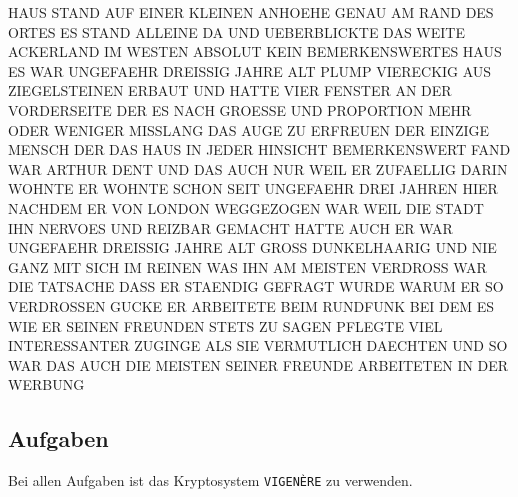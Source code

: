 \begin{spacing}{2.75}
\resetlinenumber[1]
\begin{linenumbers}
\ttfamily
HAUS STAND AUF EINER KLEINEN ANHOEHE GENAU AM RAND DES ORTES ES STAND 
ALLEINE DA UND UEBERBLICKTE DAS WEITE ACKERLAND IM WESTEN ABSOLUT KEIN 
BEMERKENSWERTES HAUS ES WAR UNGEFAEHR DREISSIG JAHRE ALT PLUMP VIERECKIG 
AUS ZIEGELSTEINEN ERBAUT UND HATTE VIER FENSTER AN DER VORDERSEITE DER ES 
NACH GROESSE UND PROPORTION MEHR ODER WENIGER MISSLANG DAS AUGE ZU ERFREUEN 
DER EINZIGE MENSCH DER DAS HAUS IN JEDER HINSICHT BEMERKENSWERT FAND WAR 
ARTHUR DENT UND DAS AUCH NUR WEIL ER ZUFAELLIG DARIN WOHNTE ER WOHNTE SCHON 
SEIT UNGEFAEHR DREI JAHREN HIER NACHDEM ER VON LONDON WEGGEZOGEN WAR WEIL DIE 
STADT IHN NERVOES UND REIZBAR GEMACHT HATTE AUCH ER WAR UNGEFAEHR DREISSIG JAHRE 
ALT GROSS DUNKELHAARIG UND NIE GANZ MIT SICH IM REINEN WAS IHN AM MEISTEN 
VERDROSS WAR DIE TATSACHE DASS ER STAENDIG GEFRAGT WURDE WARUM ER SO VERDROSSEN 
GUCKE ER ARBEITETE BEIM RUNDFUNK BEI DEM ES WIE ER SEINEN FREUNDEN STETS ZU 
SAGEN PFLEGTE VIEL INTERESSANTER ZUGINGE ALS SIE VERMUTLICH DAECHTEN UND SO 
WAR DAS AUCH DIE MEISTEN SEINER FREUNDE ARBEITETEN IN DER WERBUNG 
\end{linenumbers}
\end{spacing}

\newpage

\subsection{Aufgaben}

Bei allen Aufgaben ist das Kryptosystem \texttt{VIGENÈRE} zu verwenden.

